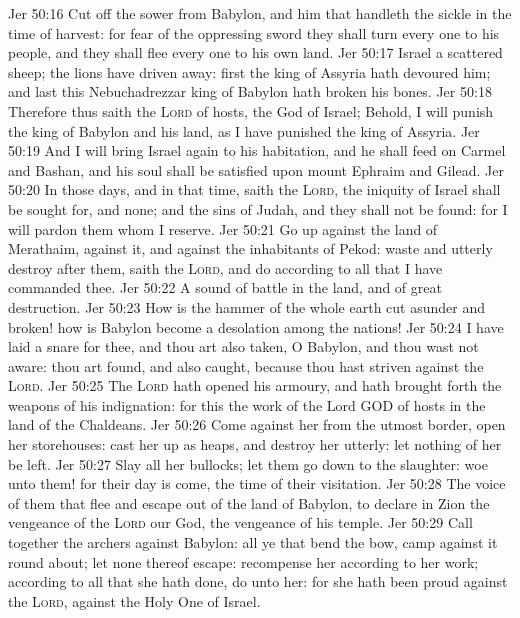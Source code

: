 \vs Jer 50:16 Cut off the sower from Babylon, and him that handleth the sickle in the time of harvest: for fear of the oppressing sword they shall turn every one to his people, and they shall flee every one to his own land.
\vs Jer 50:17 Israel  a scattered sheep; the lions have driven  away: first the king of Assyria hath devoured him; and last this Nebuchadrezzar king of Babylon hath broken his bones.
\vs Jer 50:18 Therefore thus saith the \textsc{Lord} of hosts, the God of Israel; Behold, I will punish the king of Babylon and his land, as I have punished the king of Assyria.
\vs Jer 50:19 And I will bring Israel again to his habitation, and he shall feed on Carmel and Bashan, and his soul shall be satisfied upon mount Ephraim and Gilead.
\vs Jer 50:20 In those days, and in that time, saith the \textsc{Lord}, the iniquity of Israel shall be sought for, and  none; and the sins of Judah, and they shall not be found: for I will pardon them whom I reserve.
\vs Jer 50:21 Go up against the land of Merathaim,  against it, and against the inhabitants of Pekod: waste and utterly destroy after them, saith the \textsc{Lord}, and do according to all that I have commanded thee.
\vs Jer 50:22 A sound of battle  in the land, and of great destruction.
\vs Jer 50:23 How is the hammer of the whole earth cut asunder and broken! how is Babylon become a desolation among the nations!
\vs Jer 50:24 I have laid a snare for thee, and thou art also taken, O Babylon, and thou wast not aware: thou art found, and also caught, because thou hast striven against the \textsc{Lord}.
\vs Jer 50:25 The \textsc{Lord} hath opened his armoury, and hath brought forth the weapons of his indignation: for this  the work of the Lord GOD of hosts in the land of the Chaldeans.
\vs Jer 50:26 Come against her from the utmost border, open her storehouses: cast her up as heaps, and destroy her utterly: let nothing of her be left.
\vs Jer 50:27 Slay all her bullocks; let them go down to the slaughter: woe unto them! for their day is come, the time of their visitation.
\vs Jer 50:28 The voice of them that flee and escape out of the land of Babylon, to declare in Zion the vengeance of the \textsc{Lord} our God, the vengeance of his temple.
\vs Jer 50:29 Call together the archers against Babylon: all ye that bend the bow, camp against it round about; let none thereof escape: recompense her according to her work; according to all that she hath done, do unto her: for she hath been proud against the \textsc{Lord}, against the Holy One of Israel.
